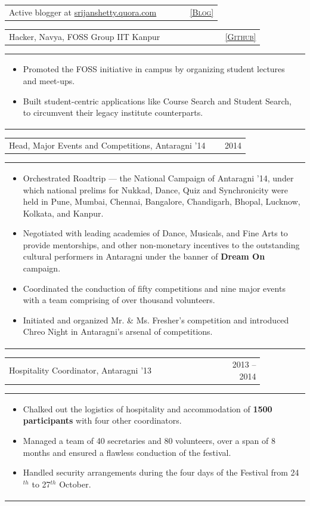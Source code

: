\documentclass[a4paper,10pt]{article} %
\newcommand{\iproject}[3]{
    \begin{tabular}{p{0.85\linewidth}r}
        \textcolor{NavyBlue}{#2} & \multicolumn{1}{m{3cm}}{\raggedleft \textsc{#1}}\\
    \end{tabular}
    \begin{tabular}{p{\linewidth}}
    \vspace{-0.3cm}
        \footnotesize{#3}
    \end{tabular}
    \vspace{-0.5cm}
}
\newcommand{\skill}[2]{
    \begin{tabular}{p{0.85\linewidth}r}
        #2 & \multicolumn{1}{m{3cm}}{\raggedleft \textsc{#1}}\\
    \end{tabular}
    \vspace{-0.5cm}
}
\begin{document}
\skill {\href{srijanshetty.quora.com} {[Blog]}}
       {Active blogger at \href{srijanshetty.quora.com} {srijanshetty.quora.com}}

\iproject {\href{https://github.com/navya} {[Github]} }
          {Hacker, Navya, FOSS Group IIT Kanpur}
          {
               \begin{itemize}[leftmargin=0.5cm]
                   \item Promoted the FOSS initiative in campus by organizing student lectures and meet-ups.
                   \item Built student-centric applications like Course Search and Student Search, to circumvent
                       their legacy institute counterparts.
               \end{itemize}
          }

\iproject {2014}
          {Head, Major Events and Competitions, Antaragni '14}
          {
               \begin{itemize}[leftmargin=0.5cm]
                    \item Orchestrated Roadtrip --- the National Campaign of Antaragni '14, under which national prelims for Nukkad, Dance, Quiz and Synchronicity were held in Pune, Mumbai, Chennai, Bangalore, Chandigarh, Bhopal, Lucknow, Kolkata, and Kanpur.
                    \item Negotiated with leading academies of Dance, Musicals, and Fine Arts to provide mentorships, and other non-monetary incentives to the outstanding cultural performers in Antaragni under the banner of \textbf{Dream On} campaign.
                    \item Coordinated the conduction of fifty competitions and nine major events with a team comprising of over thousand volunteers.
                    \item Initiated and organized Mr. \& Ms. Fresher's competition and introduced Chreo Night in Antaragni's arsenal of competitions.
               \end{itemize}
          }

\iproject {2013 -- 2014}
          {Hospitality Coordinator, Antaragni '13}
          {
               \begin{itemize}[leftmargin=0.5cm]
                   \item Chalked out the logistics of hospitality and accommodation of \textbf{1500 participants} with four other coordinators.
                   \item Managed a team of 40 secretaries and 80 volunteers, over a span of 8 months and ensured a flawless conduction of the festival.
                   \item Handled security arrangements during the four days of the Festival from 24$^{th}$ to 27$^{th}$ October.
               \end{itemize}
          }
\end{document}
